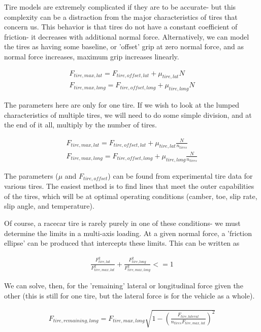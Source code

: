 \documentclass{article}
\begin{document}
Tire models are extremely complicated if they are to be accurate- but this complexity can be a distraction from the major characteristics of tires that concern us. This behavior is that tires do not have a constant coefficient of friction- it decreases with additional normal force. Alternatively, we can model the tires as having some baseline, or 'offset' grip at zero normal force, and as normal force increases, maximum grip increases linearly.

\begin{align}
	F_{tire,max,lat} = F_{tire,offset,lat} + \mu_{tire,lat} N \\
	F_{tire,max,long} = F_{tire,offset,long} + \mu_{tire,long} N
\end{align}

The parameters here are only for one tire. If we wish to look at the lumped characteristics of multiple tires, we will need to do some simple division, and at the end of it all, multiply by the number of tires.

\begin{align}
	F_{tire,max,lat} = F_{tire,offset,lat} + \mu_{tire,lat} \frac{N}{n_{tires}} \\
	F_{tire,max,long} = F_{tire,offset,long} + \mu_{tire,long} \frac{N}{n_{tires}}
\end{align}

The parameters ($\mu$ and $F_{tire,offset}$) can be found from experimental tire data for various tires. The easiest method is to find lines that meet the outer capabilities of the tires, which will be at optimal operating conditions (camber, toe, slip rate, slip angle, and temperature).

Of course, a racecar tire is rarely purely in one of these conditions- we must determine the limits in a multi-axis loading. At a given normal force, a 'friction ellipse' can be produced that intercepts these limits. This can be written as

\begin{align}
	\frac{F_{tire,lat}^2}{F_{tire,max,lat}^2} + \frac{F_{tire,long}^2}{F_{tire,max,long}^2} <= 1
\end{align}

We can solve, then, for the 'remaining' lateral or longitudinal force given the other (this is still for one tire, but the lateral force is for the vehicle as a whole).

\begin{align}
	F_{tire,remaining,long} = F_{tire,max,long} \sqrt{1-(\frac{F_{tire,lateral}}{n_{tires} F_{tire,max,lat}})^2} 
\end{align}
\end{document}
